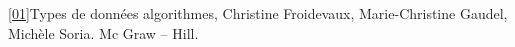\begin{defi}[Arc]

\end{defi}


\begin{defi}[Arête]

\end{defi}


\begin{defi}[Boucle]

\end{defi}


\begin{defi}

\end{defi}



\begin{defi}

\end{defi}


\begin{defi}[Cycle]

\end{defi}


\begin{defi}

\end{defi}







\ref{01}{Types de données algorithmes, Christine Froidevaux, Marie-Christine Gaudel, Michèle Soria. Mc Graw -- Hill.}